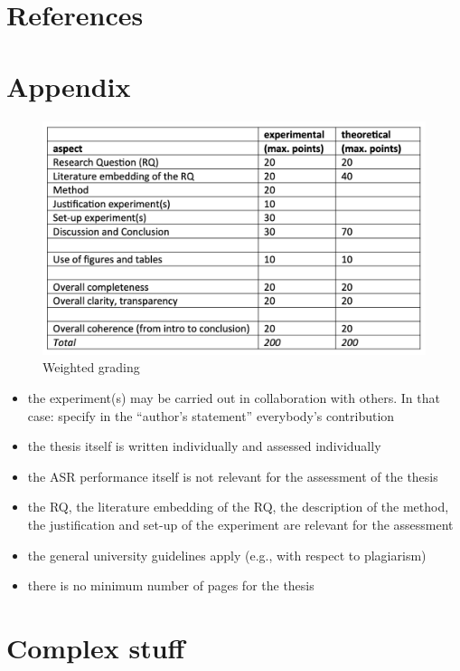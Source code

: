 \documentclass{article}
\theoremstyle{definition}
\theoremstyle{remark}
\begin{document}
\section{References}




\section{Appendix}

\begin{figure}[h]
    \centering
    \includegraphics[width=1\textwidth]{img/grading.png}
    \caption{Weighted grading}
    \label{fig:my_label}
\end{figure}

\begin{itemize}
	\item the experiment(s) may be carried out in collaboration with others. In that case: specify in the “author’s statement” everybody’s contribution
	\item the thesis itself is written individually and assessed individually
	\item the ASR performance itself is not relevant for the assessment of the thesis
	\item the RQ, the literature embedding of the RQ, the description of the method, the justification and set-up of the experiment are relevant for the assessment 
	\item the general university guidelines apply (e.g., with respect to plagiarism)
	\item there is no minimum number of pages for the thesis
\end{itemize}



\section{Complex stuff}
\end{document}
